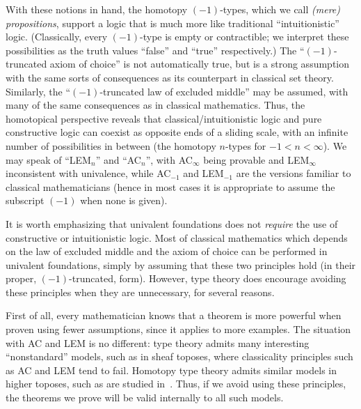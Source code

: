 With these notions in hand, the homotopy $(-1)$-types, which we call \emph{(mere) propositions}, support a logic that is much more like traditional ``intuitionistic'' logic.
(Classically, every $(-1)$-type is empty or contractible; we interpret these possibilities as the truth values ``false'' and ``true'' respectively.)
The ``$(-1)$-truncated axiom of choice'' is not automatically true, but is a strong assumption with the same sorts of consequences as its counterpart in classical set theory.
Similarly, the ``$(-1)$-truncated law of excluded middle'' may be assumed, with many of the same consequences as in classical mathematics.
Thus, the homotopical perspective reveals that classical/intuitionistic logic and pure constructive logic can coexist as opposite ends of a sliding scale, with an infinite number of possibilities in between (the homotopy $n$-types for $-1 < n < \infty$).
We may speak of ``LEM$_n$'' and ``AC$_n$'', with AC$_\infty$ being provable and LEM$_\infty$ inconsistent with univalence, while AC$_{-1}$ and LEM$_{-1}$ are the versions familiar to classical mathematicians (hence in most cases it is appropriate to assume the subscript $(-1)$ when none is given).

It is worth emphasizing that univalent foundations does not \emph{require} the use of constructive or intuitionistic logic.
Most of classical mathematics which depends on the law of excluded middle and the axiom of choice can be performed in univalent foundations, simply by assuming that these two principles hold (in their proper, $(-1)$-truncated, form).
However, type theory does encourage avoiding these principles when they are unnecessary, for several reasons.

First of all, every mathematician knows that a theorem is more powerful when proven using fewer assumptions, since it applies to more examples.
The situation with AC and LEM is no different:
type theory admits many interesting ``nonstandard'' models, such as in sheaf toposes, where classicality principles such as AC and LEM tend to fail.
Homotopy type theory admits similar models in higher toposes, such as are studied in~\cite{ToenVezzosi02,Rezk05,lurie:higher-topoi}.
Thus, if we avoid using these principles, the theorems we prove will be valid internally to all such models.

